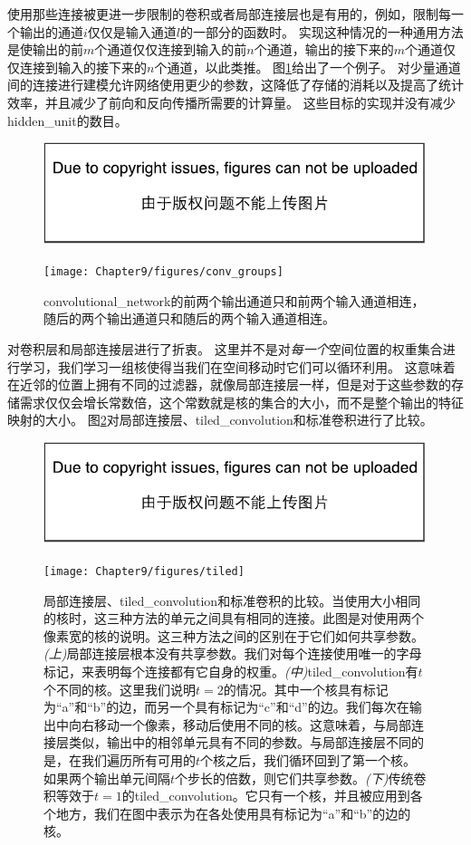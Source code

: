 使用那些连接被更进一步限制的卷积或者局部连接层也是有用的，例如，限制每一个输出的通道$i$仅仅是输入通道$l$的一部分的函数时。
实现这种情况的一种通用方法是使输出的前$m$个通道仅仅连接到输入的前$n$个通道，输出的接下来的$m$个通道仅仅连接到输入的接下来的$n$个通道，以此类推。
图\ref{fig:chap9_conv_groups}给出了一个例子。
对少量通道间的连接进行建模允许网络使用更少的参数，这降低了存储的消耗以及提高了统计效率，并且减少了前向和反向传播所需要的计算量。
这些目标的实现并没有减少\gls{hidden_unit}的数目。
\begin{figure}[!htb]
\ifOpenSource
\centerline{\includegraphics{figure.pdf}}
\else
\centerline{\texttt{[image: Chapter9/figures/conv\_groups]}}
\fi
\caption{\gls{convolutional_network}的前两个输出通道只和前两个输入通道相连，随后的两个输出通道只和随后的两个输入通道相连。}
\label{fig:chap9_conv_groups}
\end{figure}

\citep{Gregor+LeCun-2010,Le2010}对卷积层和局部连接层进行了折衷。%
这里并不是对\emph{每一个}空间位置的权重集合进行学习，我们学习一组核使得当我们在空间移动时它们可以循环利用。
这意味着在近邻的位置上拥有不同的过滤器，就像局部连接层一样，但是对于这些参数的存储需求仅仅会增长常数倍，这个常数就是核的集合的大小，而不是整个输出的特征映射的大小。
图\ref{fig:chap9_tiled}对局部连接层、\gls{tiled_convolution}和标准卷积进行了比较。
\begin{figure}[!htb]
\ifOpenSource
\centerline{\includegraphics{figure.pdf}}
\else
\centerline{\texttt{[image: Chapter9/figures/tiled]}}
\fi
\captionsetup{singlelinecheck=off}
\caption[.]{局部连接层、\gls{tiled_convolution}和标准卷积的比较。当使用大小相同的核时，这三种方法的单元之间具有相同的连接。此图是对使用两个像素宽的核的说明。这三种方法之间的区别在于它们如何共享参数。\emph{(上)}局部连接层根本没有共享参数。我们对每个连接使用唯一的字母标记，来表明每个连接都有它自身的权重。\emph{(中)}\gls{tiled_convolution}有$t$个不同的核。这里我们说明$t=2$的情况。其中一个核具有标记为``a''和``b''的边，而另一个具有标记为``c''和``d''的边。我们每次在输出中向右移动一个像素，移动后使用不同的核。这意味着，与局部连接层类似，输出中的相邻单元具有不同的参数。与局部连接层不同的是，在我们遍历所有可用的$t$个核之后，我们循环回到了第一个核。如果两个输出单元间隔$t$个步长的倍数，则它们共享参数。\emph{(下)}传统卷积等效于$t=1$的\gls{tiled_convolution}。它只有一个核，并且被应用到各个地方，我们在图中表示为在各处使用具有标记为``a''和``b''的边的核。}
\label{fig:chap9_tiled}
\end{figure}
 
